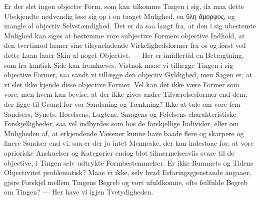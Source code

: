 \documentclass[12pt]{article}
\newcommand{\opage}[1]{\marginnote{\footnotesize\textit{[#1]}}}
\begin{document}
Er der slet ingen objectiv Form, som kan tilkomme Tingen
i sig, da maa dette Ubekjendte nødvendig løse sig op i en
taaget Mulighed, en ὕλη ἄμορφος, og mangle al objectiv
Selvstændighed. Det er da saa langt fra, at den i sig ubestemte
Mulighed kan siges at bestemme vore subjective Formers
objective Indhold, at den tvertimod laaner sine tilsyneladende
Virkelighedsformer fra os og først ved dette Laan faaer Skin af
noget Objectivt. --- Her er imidlertid en Betragtning, som fra
kantisk Side kan fremhæves. Vistnok maae vi tillægge Tingen
i sig objective Former, saa sandt vi tillægge den objectiv
Gyldighed, men Sagen er, at vi slet ikke kjende disse objective
Former. Vel kan det ikke være Former som vore; men hvem
kan bevise, at der ikke gives andre Tilværelsesformer end dem,
der ligge til Grund for vor Sandsning og Tænkning? Ikke at
tale om vore fem Sandsers, Synets, Hørelsens, Lugtens,
Smagens og Følelsens charakteristiske Forskjelligheder, saa vel
indbyrdes som hos de forskjellige Individer, eller om
Muligheden af, at erkjendende Væsener kunne have baade flere og
skarpere og finere Sandser end vi, saa er der jo intet Menneske,
der kan indestaae for, at vore aprioriske Anskuelser og
Kategorier endog blot tilnærmelsesviis svare til de objective, i
\opage{14} Tingen selv udtrykte Formbestemmelser. Er ikke Rummets og
Tidens Objectivitet problematisk? Maae vi ikke, selv hvad
Erfaringsgjenstande angaaer, gjøre Forskjel mellem Tingens
Begreb og vort ufuldkomne, ofte feilfulde Begreb om Tingen?
--- Her have vi igjen Tvetydigheden.
\end{document}
